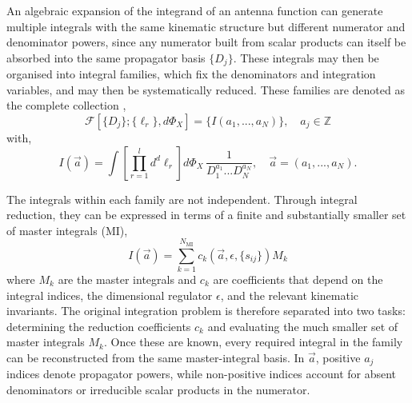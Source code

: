 An algebraic expansion of the integrand of an antenna function can generate multiple
integrals with the same kinematic structure but different numerator and denominator
powers, since any numerator built from scalar products can itself be absorbed into
the same propagator basis $\{D_j\}$. These
integrals may then be organised into integral families, which fix the denominators
and integration variables, and may then be systematically reduced. These families
are denoted as the complete collection \cite{GehrmannDeRidder0311276},
\begin{equation}
    \mathcal F[\{D_j\};\{\ell_r\},d\Phi_X] = \{I(a_1,...,a_N)\},\quad a_j\in\mathbb Z
\end{equation}
with,
\begin{equation}\label{eq:intFamily}
    I(\vec a) = \int\left[\prod_{r=1}^ld^d\ell_r\right]d\Phi_X\,\frac1{D_1^{a_1}...D_N^{a_N}},\quad \vec a = (a_1,...,a_N).
\end{equation}

The integrals within each family are not independent. Through integral reduction, they
can be expressed in terms of a finite and substantially smaller set of master
integrals (MI),
\begin{equation}
    I(\vec a) = \sum_{k=1}^{N_\text{MI}}c_k(\vec a, \epsilon, \{s_{ij}\})M_k
\end{equation}
where $M_k$ are the master integrals and $c_k$ are coefficients that depend on the
integral indices, the dimensional regulator $\epsilon$, and the relevant kinematic
invariants. The original integration problem is therefore separated into two tasks:
determining the reduction coefficients $c_k$ and evaluating the much smaller set of
master integrals $M_k$. Once these are known, every required integral in the family can
be reconstructed from the same master-integral basis. In $\vec a$, positive $a_j$
indices denote propagator powers, while non-positive indices account for absent
denominators or irreducible scalar products in the numerator.

